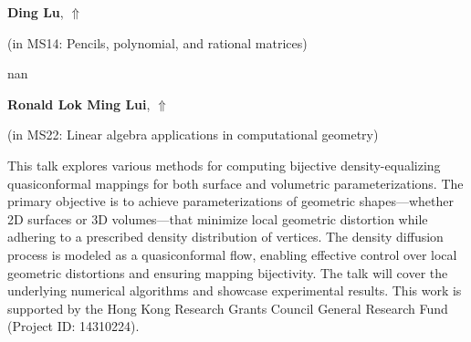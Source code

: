 \documentclass[ILAS2025-program.tex]{subfiles}
\begin{document}
\hypertarget{down0371}{}\begin{ilasabstract}
    
\textbf{Ding Lu},  \hfill \hyperlink{up0371}{$\Uparrow$}
    
    
(in {\color{mstitle}MS14: Pencils, polynomial, and rational matrices})
        
\mtskip
    nan
\end{ilasabstract}
    

\hypertarget{down0035}{}\begin{ilasabstract}
    
\textbf{Ronald Lok Ming Lui},  \hfill \hyperlink{up0035}{$\Uparrow$}
    
    
(in {\color{mstitle}MS22: Linear algebra applications in computational geometry})
        
\mtskip
    This talk explores various methods for computing bijective density-equalizing quasiconformal mappings for both surface and volumetric parameterizations. The primary objective is to achieve parameterizations of geometric shapes—whether 2D surfaces or 3D volumes—that minimize local geometric distortion while adhering to a prescribed density distribution of vertices. The density diffusion process is modeled as a quasiconformal flow, enabling effective control over local geometric distortions and ensuring mapping bijectivity. The talk will cover the underlying numerical algorithms and showcase experimental results. This work is supported by the Hong Kong Research Grants Council General Research Fund (Project ID: 14310224).

\end{ilasabstract}
    
\end{document}
